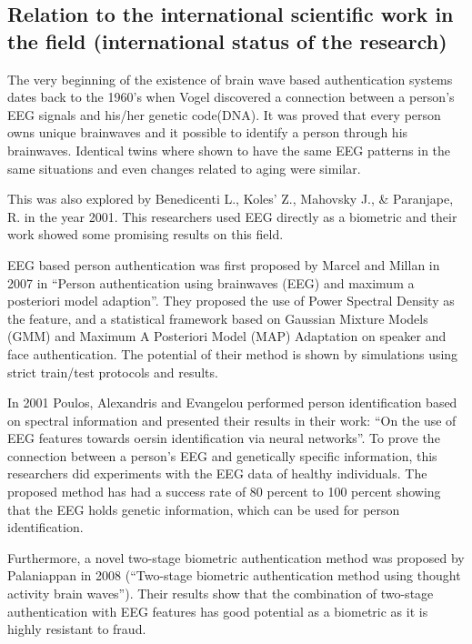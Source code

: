 \documentclass[a4paper,11pt]{article}
\begin{document}
\subsection{Relation to the international scientific work in the field (international status of the research)}
The very beginning of the existence of brain wave based authentication systems dates back to the 1960's when Vogel discovered a connection between a person's EEG signals and his/her genetic code(DNA). It was proved that every person owns unique brainwaves and it possible to identify a person through his brainwaves. Identical twins where shown to have the same EEG patterns in the same situations and even changes related to aging were similar. 


This was also explored by Benedicenti L., Koles’ Z., Mahovsky J., \& Paranjape, R. in the year 2001. This researchers used EEG directly as a biometric and their work showed some promising results on this field.


EEG based person authentication was first proposed by Marcel and Millan in 2007 in “Person authentication using brainwaves (EEG) and maximum a posteriori model adaption”. They proposed the use of  Power Spectral Density as the feature, and a statistical framework based on Gaussian Mixture  Models (GMM) and Maximum A Posteriori Model (MAP) Adaptation on speaker and face  authentication. The potential of their method is shown by simulations using strict train/test protocols and results. 

In 2001 Poulos, Alexandris and Evangelou performed person identification based on spectral information and presented their results in their work: “On the use of EEG features towards oersin identification via neural networks”. To prove the connection between a person's EEG and genetically specific information, this researchers did experiments with the EEG data of healthy individuals. The proposed method has had a success rate of 80 percent to 100 percent showing that the EEG holds genetic information, which can be used for person identification.


Furthermore, a novel two-stage biometric authentication method was proposed by Palaniappan in 2008 (“Two-stage biometric authentication method using thought activity brain waves”). Their results show that the combination of two-stage authentication with EEG features has good potential as a biometric as it is highly resistant to fraud.
\end{document}
